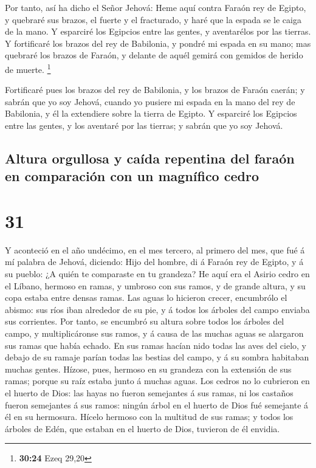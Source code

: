  Por tanto, así ha dicho el Señor Jehová: Heme aquí contra
Faraón rey de Egipto, y quebraré sus brazos, el fuerte y el fracturado,
y haré que la espada se le caiga de la mano.  Y esparciré
los Egipcios entre las gentes, y aventarélos por las tierras.
 Y fortificaré los brazos del rey de Babilonia, y pondré mi
espada en su mano; mas quebraré los brazos de Faraón, y delante de aquél
gemirá con gemidos de herido de muerte. \footnote{\textbf{30:24} Ezeq
  29,20}

 Fortificaré pues los brazos del rey de Babilonia, y los
brazos de Faraón caerán; y sabrán que yo soy Jehová, cuando yo pusiere
mi espada en la mano del rey de Babilonia, y él la extendiere sobre la
tierra de Egipto.  Y esparciré los Egipcios entre las
gentes, y los aventaré por las tierras; y sabrán que yo soy Jehová.

\hypertarget{altura-orgullosa-y-cauxedda-repentina-del-farauxf3n-en-comparaciuxf3n-con-un-magnuxedfico-cedro}{%
\subsection{Altura orgullosa y caída repentina del faraón en comparación
con un magnífico
cedro}\label{altura-orgullosa-y-cauxedda-repentina-del-farauxf3n-en-comparaciuxf3n-con-un-magnuxedfico-cedro}}

\hypertarget{section-30}{%
\section{31}\label{section-30}}

 Y aconteció en el año undécimo, en el mes tercero, al
primero del mes, que fué á mí palabra de Jehová, diciendo: 
Hijo del hombre, di á Faraón rey de Egipto, y á su pueblo: ¿A quién te
comparaste en tu grandeza?  He aquí era el Asirio cedro en
el Líbano, hermoso en ramas, y umbroso con sus ramos, y de grande
altura, y su copa estaba entre densas ramas.  Las aguas lo
hicieron crecer, encumbrólo el abismo: sus ríos iban alrededor de su
pie, y á todos los árboles del campo enviaba sus corrientes.
 Por tanto, se encumbró su altura sobre todos los árboles
del campo, y multiplicáronse sus ramos, y á causa de las muchas aguas se
alargaron sus ramas que había echado.  En sus ramas hacían
nido todas las aves del cielo, y debajo de su ramaje parían todas las
bestias del campo, y á su sombra habitaban muchas gentes. 
Hízose, pues, hermoso en su grandeza con la extensión de sus ramas;
porque su raíz estaba junto á muchas aguas.  Los cedros no
lo cubrieron en el huerto de Dios: las hayas no fueron semejantes á sus
ramas, ni los castaños fueron semejantes á sus ramos: ningún árbol en el
huerto de Dios fué semejante á él en su hermosura.  Hícelo
hermoso con la multitud de sus ramas; y todos los árboles de Edén, que
estaban en el huerto de Dios, tuvieron de él envidia.

